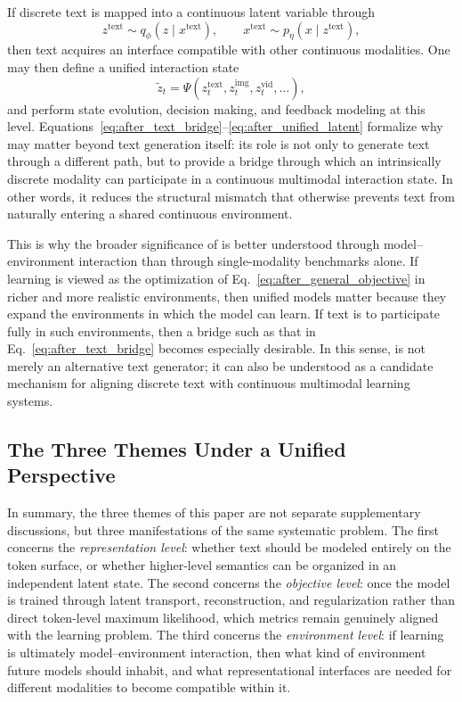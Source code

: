 If discrete text is mapped into a continuous latent variable through
\begin{equation}
z^{\mathrm{text}}\sim q_\phi(z\mid x^{\mathrm{text}}),
\qquad
x^{\mathrm{text}}\sim p_\eta(x\mid z^{\mathrm{text}}),
\label{eq:after_text_bridge}
\end{equation}
then text acquires an interface compatible with other continuous modalities. One may then define a unified interaction state
\begin{equation}
\tilde z_t
=
\Psi\!\left(
z_t^{\mathrm{text}},
z_t^{\mathrm{img}},
z_t^{\mathrm{vid}},
\dots
\right),
\label{eq:after_unified_latent}
\end{equation}
and perform state evolution, decision making, and feedback modeling at this level. Equations~\eqref{eq:after_text_bridge}--\eqref{eq:after_unified_latent} formalize why \method may matter beyond text generation itself: its role is not only to generate text through a different path, but to provide a bridge through which an intrinsically discrete modality can participate in a continuous multimodal interaction state. In other words, it reduces the structural mismatch that otherwise prevents text from naturally entering a shared continuous environment.

This is why the broader significance of \method is better understood through model--environment interaction than through single-modality benchmarks alone. If learning is viewed as the optimization of Eq.~\eqref{eq:after_general_objective} in richer and more realistic environments, then unified models matter because they expand the environments in which the model can learn. If text is to participate fully in such environments, then a bridge such as that in Eq.~\eqref{eq:after_text_bridge} becomes especially desirable. In this sense, \method is not merely an alternative text generator; it can also be understood as a candidate mechanism for aligning discrete text with continuous multimodal learning systems.

\subsection{The Three Themes Under a Unified Perspective}

In summary, the three themes of this paper are not separate supplementary discussions, but three manifestations of the same systematic problem. The first concerns the \emph{representation level}: whether text should be modeled entirely on the token surface, or whether higher-level semantics can be organized in an independent latent state. The second concerns the \emph{objective level}: once the model is trained through latent transport, reconstruction, and regularization rather than direct token-level maximum likelihood, which metrics remain genuinely aligned with the learning problem. The third concerns the \emph{environment level}: if learning is ultimately model--environment interaction, then what kind of environment future models should inhabit, and what representational interfaces are needed for different modalities to become compatible within it.

